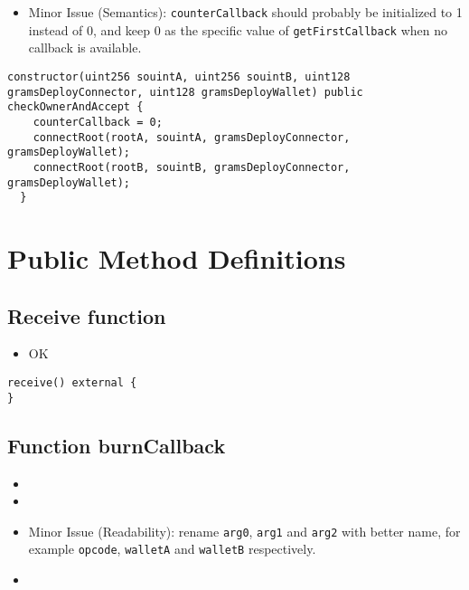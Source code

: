 \begin{itemize}
\item Minor Issue (Semantics): {\tt counterCallback} should probably be
  initialized to 1 instead of 0, and keep 0 as the specific value of
  {\tt getFirstCallback} when no callback is available.
\end{itemize}

\begin{lstlisting}[firstnumber=88]
  constructor(uint256 souintA, uint256 souintB, uint128 gramsDeployConnector, uint128 gramsDeployWallet) public checkOwnerAndAccept {
    counterCallback = 0;
    connectRoot(rootA, souintA, gramsDeployConnector, gramsDeployWallet);
    connectRoot(rootB, souintB, gramsDeployConnector, gramsDeployWallet);
  }
\end{lstlisting}

\section{Public Method Definitions}


\subsection{Receive function}

\begin{itemize}
\item OK
\end{itemize}

\begin{lstlisting}[firstnumber=609]
receive() external {
}
\end{lstlisting}

\subsection{Function burnCallback}

\begin{itemize}
\item {}
\item {}
\item Minor Issue (Readability): rename {\tt arg0}, {\tt arg1} and
  {\tt arg2} with better name, for example {\tt opcode}, {\tt walletA}
  and {\tt walletB} respectively.
\item \issueEncodeBody
\end{itemize}

